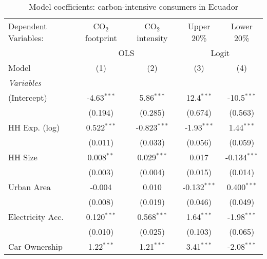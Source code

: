 
\begin{table}[htbp!]
   \centering
   \small
   \begin{adjustbox}{width = 1\textwidth, max height = 0.95\textheight, center}
      \begin{threeparttable}[b]
         \caption{\label{tab:Logit_1_ECU} Model coefficients: carbon-intensive consumers in Ecuador}
         \begin{tabular}{lcccc}
            \tabularnewline \midrule \midrule
            Dependent Variables: & CO$_{2}$ footprint & CO$_{2}$ intensity & Upper 20\%     & Lower 20\%\\   
             & \multicolumn{2}{c}{OLS} & \multicolumn{2}{c}{Logit} \\ 
            Model                & (1)                & (2)                & (3)            & (4)\\  
            \midrule
            \emph{Variables}\\
            (Intercept)          & -4.63$^{***}$      & 5.86$^{***}$       & 12.4$^{***}$   & -10.5$^{***}$\\   
                                 & (0.194)            & (0.285)            & (0.674)        & (0.563)\\   
            HH Exp. (log)        & 0.522$^{***}$      & -0.823$^{***}$     & -1.93$^{***}$  & 1.44$^{***}$\\   
                                 & (0.011)            & (0.033)            & (0.056)        & (0.059)\\   
            HH Size              & 0.008$^{**}$       & 0.029$^{***}$      & 0.017          & -0.134$^{***}$\\   
                                 & (0.003)            & (0.004)            & (0.015)        & (0.014)\\   
            Urban Area           & -0.004             & 0.010              & -0.132$^{***}$ & 0.400$^{***}$\\   
                                 & (0.008)            & (0.019)            & (0.046)        & (0.049)\\   
            Electricity Acc.     & 0.120$^{***}$      & 0.568$^{***}$      & 1.64$^{***}$   & -1.98$^{***}$\\   
                                 & (0.010)            & (0.025)            & (0.103)        & (0.065)\\   
            Car Ownership        & 1.22$^{***}$       & 1.21$^{***}$       & 3.41$^{***}$   & -2.08$^{***}$\\   

\end{tabular}
\end{threeparttable}
\end{adjustbox}
\end{table}
